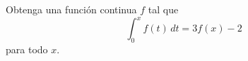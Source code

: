 \item Obtenga una función continua $f$ tal que 
    \[ \int_{0}^{x} f(t) \, dt = 3f(x) - 2 \]
    para todo $x$.

